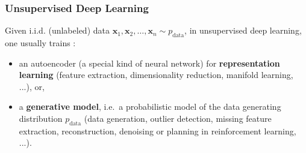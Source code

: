 \documentclass[11pt,compress,t,notes=noshow, xcolor=table]{beamer}
\begin{document}

\begin{frame}[fragile]
\frametitle{Unsupervised Deep Learning}
Given i.i.d. (unlabeled) data $\mathbf{x}_1, \mathbf{x}_2,\dots, \mathbf{x}_n \sim  p_{\text{data}}$, 
 in unsupervised deep learning, one usually trains :

 \begin{itemize}
 
 \item  an autoencoder (a special kind of neural network) for \textbf{representation learning} (feature extraction, dimensionality reduction, manifold learning, ...), or, \\

 \pause
 
  \item a \textbf{generative model}, i.e.~a probabilistic model of the  data generating distribution  $p_{\text{data}}$ 
  (data generation, outlier detection, missing feature extraction, reconstruction, denoising or planning in reinforcement learning, ...). 
  
  
 \end{itemize}

\end{frame} 
\end{document}
